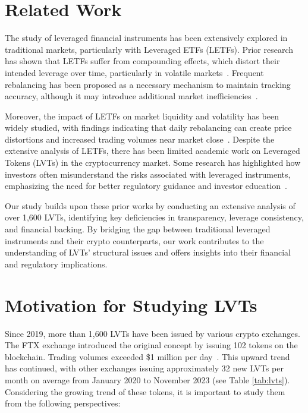 \section{Related Work}
The study of leveraged financial instruments has been extensively explored in traditional markets, particularly with Leveraged ETFs (LETFs). Prior research has shown that LETFs suffer from compounding effects, which distort their intended leverage over time, particularly in volatile markets~\cite{trainor2010,guedj2010,mackintosh2008,cheng2010,charupat2011}. Frequent rebalancing has been proposed as a necessary mechanism to maintain tracking accuracy, although it may introduce additional market inefficiencies~\cite{cheng2009,hill2009,leung2012}.

Moreover, the impact of LETFs on market liquidity and volatility has been widely studied, with findings indicating that daily rebalancing can create price distortions and increased trading volumes near market close~\cite{rompotis2016,shum2016,trainor2010,guedj2010,werner2022,kout2019}. Despite the extensive analysis of LETFs, there has been limited academic work on Leveraged Tokens (LVTs) in the cryptocurrency market. Some research has highlighted how investors often misunderstand the risks associated with leveraged instruments, emphasizing the need for better regulatory guidance and investor education~\cite{leung2012}.

Our study builds upon these prior works by conducting an extensive analysis of over 1,600 LVTs, identifying key deficiencies in transparency, leverage consistency, and financial backing. By bridging the gap between traditional leveraged instruments and their crypto counterparts, our work contributes to the understanding of LVTs’ structural issues and offers insights into their financial and regulatory implications.

\section{Motivation for Studying LVTs}
Since 2019, more than 1,600 LVTs have been issued by various crypto exchanges. The FTX exchange introduced the original concept by issuing 102 tokens on the blockchain. Trading volumes exceeded \$1 million per day~\cite{TradingVolume}. This upward trend has continued, with other exchanges issuing approximately 32 new LVTs per month on average from January 2020 to November 2023 (see Table \ref{tab:lvts}). Considering the growing trend of these tokens, it is important to study them from the following perspectives:

